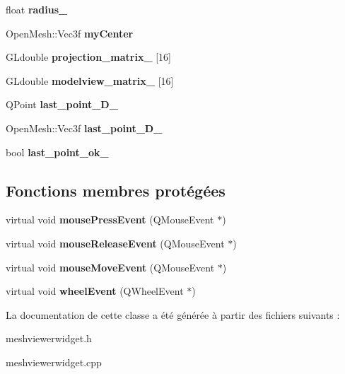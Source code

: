 \begin{DoxyCompactItemize}
\item 
\mbox{\label{classMeshViewerWidget_a06c27be573e36af466f1af30049bbcf0}} 
float {\bfseries radius\+\_\+}
\item 
\mbox{\label{classMeshViewerWidget_afba32e498a00bc44b7e1ea7b3651c464}} 
Open\+Mesh\+::\+Vec3f {\bfseries my\+Center}
\item 
\mbox{\label{classMeshViewerWidget_a808bad86a183b00c2f169f47efefeccf}} 
G\+Ldouble {\bfseries projection\+\_\+matrix\+\_\+} \mbox{[}16\mbox{]}
\item 
\mbox{\label{classMeshViewerWidget_a626f16bd69fc82a06b640f91c2f56fbc}} 
G\+Ldouble {\bfseries modelview\+\_\+matrix\+\_\+} \mbox{[}16\mbox{]}
\item 
\mbox{\label{classMeshViewerWidget_a34bb32fab41dd26eb9c55333c66da519}} 
Q\+Point {\bfseries last\+\_\+point\+\_\+D\+\_\+}
\item 
\mbox{\label{classMeshViewerWidget_a4f8a1992d01060b836557365291afdc8}} 
Open\+Mesh\+::\+Vec3f {\bfseries last\+\_\+point\+\_\+D\+\_\+}
\item 
\mbox{\label{classMeshViewerWidget_a55f9a6b15733f896eee81ff4d2b96938}} 
bool {\bfseries last\+\_\+point\+\_\+ok\+\_\+}
\end{DoxyCompactItemize}
\subsection*{Fonctions membres protégées}
\begin{DoxyCompactItemize}
\item 
\mbox{\label{classMeshViewerWidget_a4e9fce5f74bec96c86f6c7172d8597aa}} 
virtual void {\bfseries mouse\+Press\+Event} (Q\+Mouse\+Event $\ast$)
\item 
\mbox{\label{classMeshViewerWidget_ae9733594b33687a574dd5b91110cceb6}} 
virtual void {\bfseries mouse\+Release\+Event} (Q\+Mouse\+Event $\ast$)
\item 
\mbox{\label{classMeshViewerWidget_a9d6ddba4bcdb9a5b8877af7624d3d775}} 
virtual void {\bfseries mouse\+Move\+Event} (Q\+Mouse\+Event $\ast$)
\item 
\mbox{\label{classMeshViewerWidget_a33ceb3173b5c6cfafd9cf559ac84dd7b}} 
virtual void {\bfseries wheel\+Event} (Q\+Wheel\+Event $\ast$)
\end{DoxyCompactItemize}


La documentation de cette classe a été générée à partir des fichiers suivants \+:\begin{DoxyCompactItemize}
\item 
meshviewerwidget.\+h\item 
meshviewerwidget.\+cpp\end{DoxyCompactItemize}

